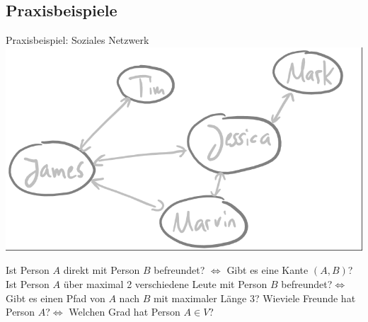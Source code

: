 \documentclass[handout]{beamer}
\begin{document}
\subsection{Praxisbeispiele}

\begin{frame}{Praxisbeispiel: Soziales Netzwerk}
	\ip\includegraphics[scale=0.4]{images/graph_beispiel_socialnetwork.png}
	\begin{itemize}
		\pitem Ist Person $A$ direkt mit Person $B$ befreundet? \pause $\Leftrightarrow$ Gibt es eine Kante $(A,B)$?
		\pitem Ist Person $A$ über maximal 2 verschiedene Leute mit Person $B$ befreundet?\pause $\Leftrightarrow$  Gibt es einen Pfad von $A$ nach $B$ mit maximaler Länge 3?
		\pitem Wieviele Freunde hat Person $A$?\pause $\Leftrightarrow$ Welchen Grad hat Person $A \in V$?
	\end{itemize}
\end{frame}
\end{document}
